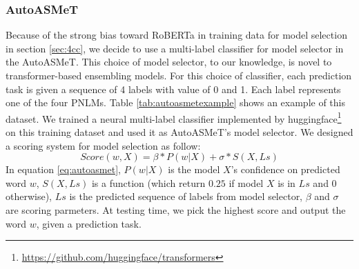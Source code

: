 \documentclass[11pt]{article}
\begin{document}
\subsubsection{AutoASMeT}

Because of the strong bias toward RoBERTa in training data for model selection in section \ref{sec:4cc}, we decide to use a multi-label classifier for model selector in the AutoASMeT. This choice of model selector, to our knowledge, is novel to transformer-based ensembling models. For this choice of classifier, each prediction task is given a sequence of 4 labels with value of 0 and 1. Each label represents one of the four PNLMs. Table \ref{tab:autoasmetexample} shows an example of this dataset. We trained a neural multi-label classifier implemented by huggingface\footnote{\url{https://github.com/huggingface/transformers}} on this training dataset and used it as AutoASMeT's model selector. We designed a scoring system for model selection as follow:
\begin{equation} \label{eq:autoasmet}
	Score(w, X) = \beta * P(w|X) + \sigma * S(X, Ls)
\end{equation}
In equation \ref{eq:autoasmet}, $P(w|X)$ is the model $X$'s confidence on predicted word $w$, $S(X, Ls)$ is a function (which return $0.25$ if model $X$ is in $Ls$ and $0$ otherwise), $Ls$ is the predicted sequence of labels from model selector, $\beta$ and $\sigma$ are scoring parmeters.  
At testing time, we pick the highest score and output the word $w$, given a prediction task.

\begin{table}
    \centering
    \caption{An example of tranining data for the AutoASMeT model. For a prediction task, a sequence of 4 labels is give in the order "RoBERTa BERT XLNet GPT-2". The value of 1 means the model correctly predict the right word, and 0 otherwise.}
    \label{tab:autoasmetexample}
\end{table}
\end{document}
